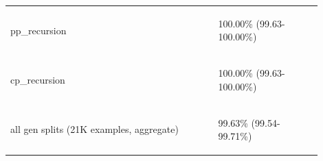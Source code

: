 \documentclass[11pt]{article}
\begin{document}
\begin{table}
\begin{tabular}{p{0.6\linewidth} p{0.3\linewidth}}
\begin{tiny}pp\_recursion\end{tiny} & \begin{tiny} 100.00\% (99.63-100.00\%)\end{tiny} \\
\begin{tiny}cp\_recursion\end{tiny} & \begin{tiny} 100.00\% (99.63-100.00\%)\end{tiny} \\
\hline
\begin{tiny}all gen splits (21K examples, aggregate)\end{tiny} & \begin{tiny}99.63\% (99.54-99.71\%)\end{tiny} \\

\end{tabular}
\end{table}
\end{document}
